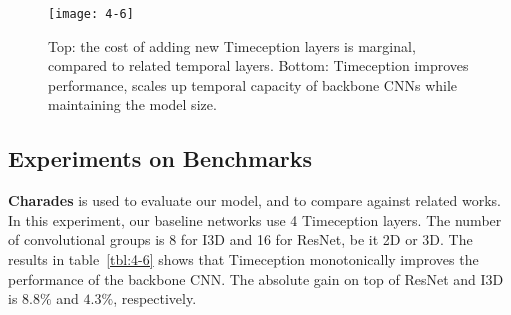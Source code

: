 \documentclass[10pt,twocolumn,letterpaper]{article}
\newcommand{\partitle}[1]{\noindent\textbf{#1}}
\begin{document}
\begin{figure}[ht]
\begin{center}
\texttt{[image: 4-6]}
\end{center}
\caption{
Top: the cost of adding new Timeception layers is marginal, compared to related temporal layers.
Bottom: Timeception improves performance, scales up temporal capacity of backbone CNNs while maintaining the model size.}
\label{fig:4-9}
\vspace*{-5mm}
\end{figure}

\subsection{Experiments on Benchmarks}

\partitle{Charades}
is used to evaluate our model, and to compare against related works.
In this experiment, our baseline networks use 4 Timeception layers.
The number of convolutional groups is 8 for I3D and 16 for ResNet, be it 2D or 3D.
The results in table~\ref{tbl:4-6} shows that Timeception monotonically improves the performance of the backbone CNN.
The absolute gain on top of ResNet and I3D is $8.8\%$ and $4.3\%$, respectively.
\end{document}
